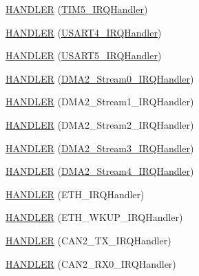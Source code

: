 \begin{DoxyCompactItemize}
\item 
\hyperlink{group___p_i_o_s_gacbcccd459a3932d4322da7c7a5c7872e}{\-H\-A\-N\-D\-L\-E\-R} (\hyperlink{group___p_i_o_s___t_i_m_ga5e66446caf21dd90191dc07a13ce2378}{\-T\-I\-M5\-\_\-\-I\-R\-Q\-Handler})
\item 
\hyperlink{group___p_i_o_s_gaede689144bb644321dd432814bf3922b}{\-H\-A\-N\-D\-L\-E\-R} (\hyperlink{group___p_i_o_s___u_s_a_r_t_gad0d53420fd047695ef9cf3fda8282d9b}{\-U\-S\-A\-R\-T4\-\_\-\-I\-R\-Q\-Handler})
\item 
\hyperlink{group___p_i_o_s_ga379aa41e763615593630b4a0cf47f68f}{\-H\-A\-N\-D\-L\-E\-R} (\hyperlink{group___p_i_o_s___u_s_a_r_t_gaea1a468c29d1d6aba1bba3f58c4b3b7e}{\-U\-S\-A\-R\-T5\-\_\-\-I\-R\-Q\-Handler})
\item 
\hyperlink{group___p_i_o_s_gad1fc97c4859b2ad38ced205b29bcdf78}{\-H\-A\-N\-D\-L\-E\-R} (\hyperlink{group___revo_mini_gaaf6ce196dde98712e1223b99766e06c0}{\-D\-M\-A2\-\_\-\-Stream0\-\_\-\-I\-R\-Q\-Handler})
\item 
\hyperlink{group___p_i_o_s_gae943fbf2f38d3e771dab065a76be5c12}{\-H\-A\-N\-D\-L\-E\-R} (\-D\-M\-A2\-\_\-\-Stream1\-\_\-\-I\-R\-Q\-Handler)
\item 
\hyperlink{group___p_i_o_s_gaa33e17f5fc95cb8d9a26872a8e92520d}{\-H\-A\-N\-D\-L\-E\-R} (\-D\-M\-A2\-\_\-\-Stream2\-\_\-\-I\-R\-Q\-Handler)
\item 
\hyperlink{group___p_i_o_s_ga00ad54696a7bfc560abb0204bbc8c71a}{\-H\-A\-N\-D\-L\-E\-R} (\hyperlink{group___freedom_ga877135f6494d6923d6f6ec32d75d9eeb}{\-D\-M\-A2\-\_\-\-Stream3\-\_\-\-I\-R\-Q\-Handler})
\item 
\hyperlink{group___p_i_o_s_ga05944aa0595b1daead2f9f88f04ba2ea}{\-H\-A\-N\-D\-L\-E\-R} (\hyperlink{group___revo_mini_ga295198ed574625d416158a5fc54205ea}{\-D\-M\-A2\-\_\-\-Stream4\-\_\-\-I\-R\-Q\-Handler})
\item 
\hyperlink{group___p_i_o_s_gaa7e4b5a35c01012524887b1579da87f2}{\-H\-A\-N\-D\-L\-E\-R} (\-E\-T\-H\-\_\-\-I\-R\-Q\-Handler)
\item 
\hyperlink{group___p_i_o_s_ga50152e398c00f62171e35ee5eff9abd3}{\-H\-A\-N\-D\-L\-E\-R} (\-E\-T\-H\-\_\-\-W\-K\-U\-P\-\_\-\-I\-R\-Q\-Handler)
\item 
\hyperlink{group___p_i_o_s_gae50f2c63fc1727fba00b306499cd8e16}{\-H\-A\-N\-D\-L\-E\-R} (\-C\-A\-N2\-\_\-\-T\-X\-\_\-\-I\-R\-Q\-Handler)
\item 
\hyperlink{group___p_i_o_s_ga2e8f3f3c4b79dedbfc64bd6303fde94a}{\-H\-A\-N\-D\-L\-E\-R} (\-C\-A\-N2\-\_\-\-R\-X0\-\_\-\-I\-R\-Q\-Handler)
\item 

\end{DoxyCompactItemize}
